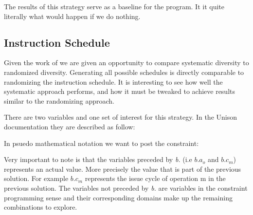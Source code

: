 The results of this strategy serve as a baseline for the program. It it quite literally
what would happen if we do nothing.

\subsection{Instruction Schedule}

Given the work of \textcite{large-scale-automated} we are given an opportunity to compare
systematic diversity to randomized diversity. Generating all possible schedules is directly
comparable to randomizing the instruction schedule. It is interesting to see how well
the systematic approach performs, and how it must be tweaked to achieve results similar
to the randomizing approach.

There are two variables and one set of interest for this strategy. In the Unison documentation
they are described as follow:

\vspace{0.2cm}

\noindent{}

\vspace{0.2cm}


In psuedo mathematical notation we want to post the constraint:

\vspace{0.2cm}
\noindent{}
\vspace{0.2cm}

Very important to note is that the variables preceded by \textit{b.} (i.e $b.a_o$ and
$b.c_m$) represents an actual value. More precisely the value that is part of the previous
solution. For example $b.c_m$ represents the issue cycle of operation m in the previous
solution. The variables not preceded by \textit{b.} are variables in the constraint
programming sense and their corresponding domains make up the remaining combinations to
explore.

